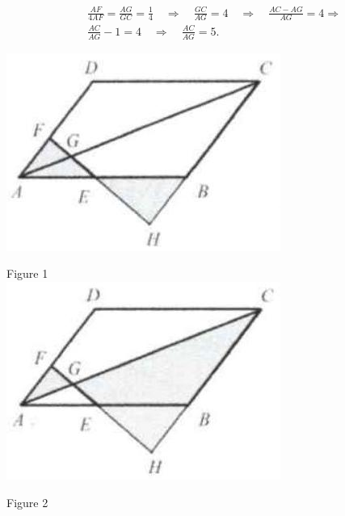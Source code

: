 \documentclass{article}
\begin{document}
\[
\begin{aligned}
& \frac{A F}{4 A F}=\frac{A G}{G C}=\frac{1}{4} \quad \Rightarrow \quad \frac{G C}{A G}=4 \quad \Rightarrow \quad \frac{A C-A G}{A G}=4 \Rightarrow \\
& \frac{A C}{A G}-1=4 \quad \Rightarrow \quad \frac{A C}{A G}=5 .
\end{aligned}
\]

\begin{center}
\includegraphics[width=\textwidth]{images/124.jpg}
\end{center}

Figure 1\\
\centering
\includegraphics[width=\textwidth]{images/124(2).jpg}

Figure 2
\end{document}
